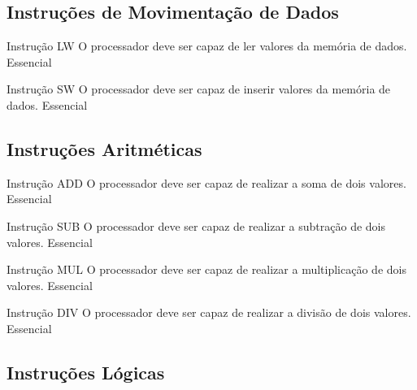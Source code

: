 \documentclass{article}
\begin{document}
  \subsection{Instruções de Movimentação de Dados}
    \begin{functional}
     \requirement
      {Instrução LW}
      {O processador deve ser capaz de ler valores da memória de dados.}
      {Essencial}
    
     \requirement
      {Instrução SW}
      {O processador deve ser capaz de inserir valores da memória de dados.}
      {Essencial}
    \end{functional}
    
    \subsection{Instruções Aritméticas}
    \begin{functional}
    
     \requirement
      {Instrução ADD}
      {O processador deve ser capaz de realizar a soma de dois valores.}
      {Essencial}
    
     \requirement
      {Instrução SUB}
      {O processador deve ser capaz de realizar a subtração de dois valores.}
      {Essencial}
      
      \requirement
      {Instrução MUL}
      {O processador deve ser capaz de realizar a multiplicação de dois valores.}
      {Essencial}
      
       \requirement
      {Instrução DIV}
      {O processador deve ser capaz de realizar a divisão de dois valores.}
      {Essencial}
    \end{functional}

  \subsection{Instruções Lógicas}
  
    \begin{functional}

      

    \end{functional}    
    
\end{document}
